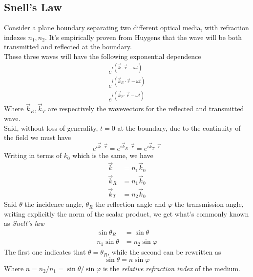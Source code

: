 \documentclass[../electromagnetism.tex]{subfiles}
\begin{document}
\subsection{Snell's Law}
Consider a plane boundary separating two different optical media, with refraction indexes $n_1, n_2$. It's empirically proven from Huygens that the wave will be both transmitted and reflected at the boundary.\\
These three waves will have the following exponential dependence
\begin{equation*}
	\begin{aligned}
		e^{i\left( \vec{k}\cdot\vec{r}-\omega t \right)}\\
		e^{i\left( \vec{k}_R\cdot\vec{r}-\omega t \right)}\\
		e^{i\left( \vec{k}_T\cdot\vec{r}-\omega t \right)}
	\end{aligned}
\end{equation*}
Where $\vec{k}_R, \vec{k}_T$ are respectively the wavevectors for the reflected and transmitted wave.\\
Said, without loss of generality, $t=0$ at the boundary, due to the continuity of the field we must have
\begin{equation*}
	e^{i\vec{k}\cdot\vec{r}}=e^{i\vec{k}_R\cdot\vec{r}}=e^{i\vec{k}_T\cdot\vec{r}}
\end{equation*}
Writing in terms of $k_0$ which is the same, we have
\begin{equation*}
	\begin{aligned}
		\vec{k}&= n_1\vec{k}_0\\
		\vec{k}_R&= n_1\vec{k}_0\\
		\vec{k}_T&= n_2\vec{k}_0
	\end{aligned}
\end{equation*}
Said $\theta$ the incidence angle, $\theta_R$ the reflection angle and $\varphi$ the transmission angle, writing explicitly the norm of the scalar product, we get what's commonly known as \textit{Snell's law}
\begin{equation}
	\begin{aligned}
		\sin\theta_R&= \sin\theta\\
		n_1\sin\theta&= n_2\sin\varphi
	\end{aligned}
	\label{eq:snell.ref}
\end{equation}
The first one indicates that $\theta=\theta_R$, while the second can be rewritten as
\begin{equation}
	\sin\theta=n\sin\varphi
	\label{eq:snell2.ref}
\end{equation}
Where $n=n_2/n_1=\sin\theta/\sin\varphi$ is the \textit{relative refraction index} of the medium.
\end{document}
